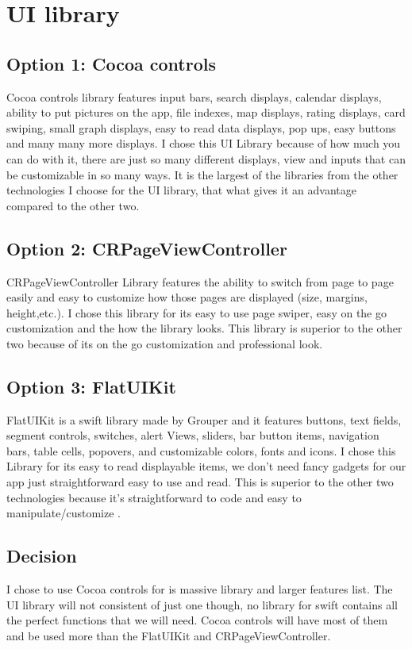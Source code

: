 \documentclass[onecolumn, draftclsnofoot,10pt, compsoc]{IEEEtran}
\begin{document}
\section{UI library}
\subsection{Option 1: Cocoa controls}
Cocoa controls library features input bars, search displays, calendar displays, ability to put pictures on the app, file indexes, map displays, rating displays, card swiping, small graph displays, easy to read data displays, pop ups, easy buttons and many many more displays. \cite{Cocoa}
I chose this UI Library because of how much you can do with it, there are just so many different displays, view and inputs that can be customizable in so many ways.
It is the largest of the libraries from the other technologies I choose for the UI library, that what gives it an advantage compared to the other two.
\subsection{Option 2: CRPageViewController}
CRPageViewController Library features the ability to switch from page to page easily and easy to customize how those pages are displayed (size, margins, height,etc.).\cite{Github1}
 I chose this library for its easy to use page swiper, easy on the go customization and the how the library looks.
This library is superior to the other two because of its on the go customization and professional look.
\subsection{Option 3: FlatUIKit}
FlatUIKit is a swift library made by Grouper and it features buttons, text fields, segment controls, switches, alert Views, sliders, bar button items, navigation bars, table cells, popovers, and customizable colors, fonts and icons.\cite{Github2}
 I chose this Library for its easy to read displayable items, we don't need fancy gadgets for our app just straightforward easy to use and read.
 This is superior to the other two technologies because it's straightforward to code and easy to manipulate/customize .
\subsection{Decision}
I chose to use Cocoa controls for is massive library and larger features list.
The UI library will not consistent of just one though, no library for swift contains all the perfect functions that we will need.
Cocoa controls will have most of them and be used more than the FlatUIKit and CRPageViewController.
\end{document}
